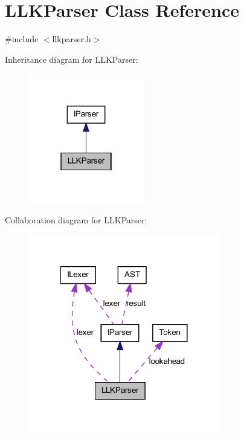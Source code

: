 \hypertarget{class_l_l_k_parser}{
\section{LLKParser Class Reference}
\label{class_l_l_k_parser}
}


{\ttfamily \#include $<$llkparser.h$>$}



Inheritance diagram for LLKParser:\nopagebreak
\begin{figure}[H]
\begin{center}
\leavevmode
\includegraphics[width=142pt]{class_l_l_k_parser__inherit__graph}
\end{center}
\end{figure}


Collaboration diagram for LLKParser:\nopagebreak
\begin{figure}[H]
\begin{center}
\leavevmode
\includegraphics[width=236pt]{class_l_l_k_parser__coll__graph}
\end{center}
\end{figure}
